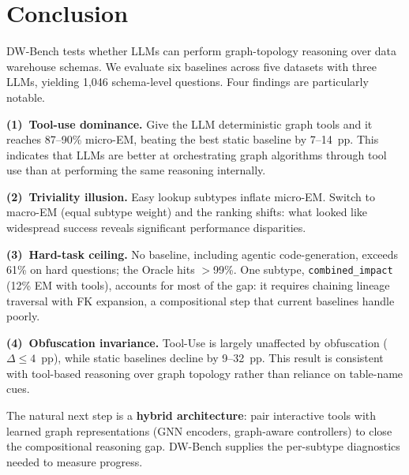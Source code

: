 \section{Conclusion}

DW-Bench tests whether LLMs can perform graph-topology reasoning over data
warehouse schemas. We evaluate six baselines across five datasets with three LLMs, yielding 1,046 schema-level questions.
Four findings are particularly notable.

\textbf{(1)~Tool-use dominance.}  Give the LLM deterministic graph tools
and it reaches 87--90\% micro-EM, beating the best static baseline by
7--14~pp. This indicates that LLMs are better at
orchestrating graph algorithms through tool use than at performing the
same reasoning internally.

\textbf{(2)~Triviality illusion.}  Easy lookup subtypes inflate micro-EM.
Switch to macro-EM (equal subtype weight) and the ranking shifts: what
looked like widespread success reveals significant performance disparities.

\textbf{(3)~Hard-task ceiling.}  No baseline, including agentic
code-generation, exceeds 61\% on hard questions; the Oracle hits $>$99\%.
One subtype, \texttt{combined\_impact} (12\% EM with tools), accounts for
most of the gap: it requires chaining lineage traversal with FK expansion,
a compositional step that current baselines handle poorly.

\textbf{(4)~Obfuscation invariance.} Tool-Use is largely unaffected by
obfuscation ($\Delta \leq 4$~pp), while static baselines decline by
9--32~pp. This result is consistent with tool-based reasoning over graph
topology rather than reliance on table-name cues.

The natural next step is a \textbf{hybrid architecture}: pair interactive
tools with learned graph representations (GNN encoders, graph-aware
controllers) to close the compositional reasoning gap.  DW-Bench supplies
the per-subtype diagnostics needed to measure progress.
